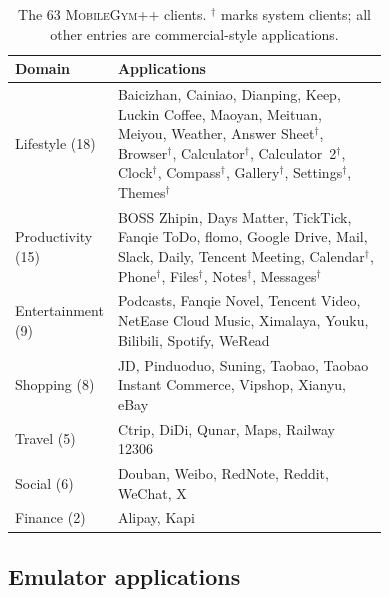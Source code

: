 \begin{table}[t]
\centering
\small
\caption{The 63 \textsc{MobileGym++} clients. $^\dagger$ marks system clients; all other entries are commercial-style applications.}
\label{tab:app-mgpp-list}
\begin{tabular}{lp{0.74\linewidth}}
\toprule
Domain & Applications \\
\midrule
Lifestyle (18) & Baicizhan, Cainiao, Dianping, Keep, Luckin Coffee, Maoyan, Meituan, Meiyou, Weather, Answer Sheet$^\dagger$, Browser$^\dagger$, Calculator$^\dagger$, Calculator~2$^\dagger$, Clock$^\dagger$, Compass$^\dagger$, Gallery$^\dagger$, Settings$^\dagger$, Themes$^\dagger$ \\
Productivity (15) & BOSS Zhipin, Days Matter, TickTick, Fanqie ToDo, flomo, Google Drive, Mail, Slack, Daily, Tencent Meeting, Calendar$^\dagger$, Phone$^\dagger$, Files$^\dagger$, Notes$^\dagger$, Messages$^\dagger$ \\
Entertainment (9) & Podcasts, Fanqie Novel, Tencent Video, NetEase Cloud Music, Ximalaya, Youku, Bilibili, Spotify, WeRead \\
Shopping (8) & JD, Pinduoduo, Suning, Taobao, Taobao Instant Commerce, Vipshop, Xianyu, eBay \\
Travel (5) & Ctrip, DiDi, Qunar, Maps, Railway 12306 \\
Social (6) & Douban, Weibo, RedNote, Reddit, WeChat, X \\
Finance (2) & Alipay, Kapi \\
\bottomrule
\end{tabular}
\end{table}

\subsection{Emulator applications}
\label{app:emu-apps}

